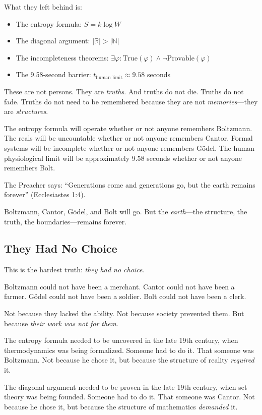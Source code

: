 \documentclass[11pt,a4paper]{article}
\begin{document}
What they left behind is:
\begin{itemize}[leftmargin=2em]
\item The entropy formula: $S = k \log W$
\item The diagonal argument: $|\mathbb{R}| > |\mathbb{N}|$
\item The incompleteness theorems: $\exists \varphi: \text{True}(\varphi) 
\land \neg \text{Provable}(\varphi)$
\item The 9.58-second barrier: $t_{\text{human limit}} \approx 9.58$ seconds
\end{itemize}

These are not persons. They are \emph{truths}. And truths do not die. Truths 
do not fade. Truths do not need to be remembered because they are not 
\emph{memories}—they are \emph{structures}.

The entropy formula will operate whether or not anyone remembers Boltzmann. 
The reals will be uncountable whether or not anyone remembers Cantor. Formal 
systems will be incomplete whether or not anyone remembers Gödel. The human 
physiological limit will be approximately 9.58 seconds whether or not anyone 
remembers Bolt.

The Preacher says: ``Generations come and generations go, but the earth 
remains forever'' (Ecclesiastes 1:4).

Boltzmann, Cantor, Gödel, and Bolt will go. But the \emph{earth}—the 
structure, the truth, the boundaries—remains forever.

\subsection{They Had No Choice}

This is the hardest truth: \emph{they had no choice}.

Boltzmann could not have been a merchant. Cantor could not have been a farmer. 
Gödel could not have been a soldier. Bolt could not have been a clerk.

Not because they lacked the ability. Not because society prevented them. But 
because \emph{their work was not for them}.

The entropy formula needed to be uncovered in the late 19th century, when 
thermodynamics was being formalized. Someone had to do it. That someone was 
Boltzmann. Not because he chose it, but because the structure of reality 
\emph{required} it.

The diagonal argument needed to be proven in the late 19th century, when set 
theory was being founded. Someone had to do it. That someone was Cantor. Not 
because he chose it, but because the structure of mathematics \emph{demanded} 
it.
\end{document}
